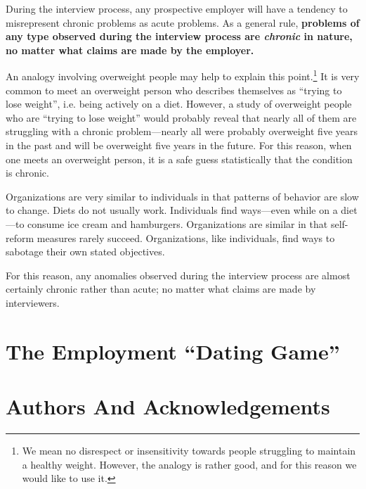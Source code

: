 During the interview process, any prospective employer will have a tendency
to misrepresent chronic problems as acute problems.  As a general rule,
\textbf{problems of any type observed during the interview process are
\emph{chronic} in nature, no matter what claims are made by the employer.}

An analogy involving overweight people may help to explain this point.\footnote{We
mean no disrespect or insensitivity towards people struggling to maintain a
healthy weight.  However, the analogy is rather good, and for this reason
we would like to use it.}  It is very common to meet an overweight person
who describes themselves as ``trying to lose weight'', i.e. being actively
on a diet.  However, a study of overweight people who are ``trying to 
lose weight'' would probably reveal that nearly all of them are struggling
with a chronic problem---nearly all were probably overweight five years
in the past and will be overweight five years in the future.  For this reason,
when one meets an overweight person, it is a safe guess statistically that
the condition is chronic.

Organizations are very similar to individuals in that patterns of behavior
are slow to change.  Diets do not usually work.  Individuals find ways---even
while on a diet---to consume ice cream and hamburgers.  Organizations are
similar in that self-reform measures rarely succeed.  Organizations, like
individuals, find ways to sabotage their own stated objectives.

For this reason, any anomalies observed during the interview process are
almost certainly chronic rather than acute; no matter what claims
are made by interviewers.



\section{The Employment ``Dating Game''}




\section{Authors And Acknowledgements}




